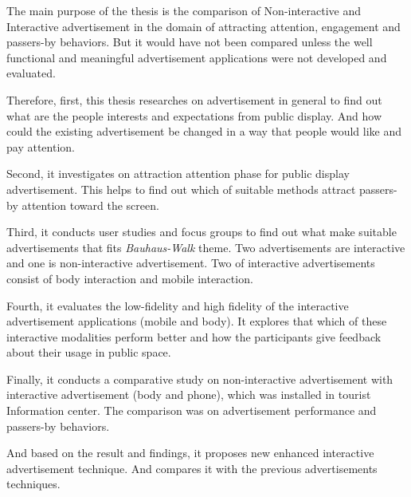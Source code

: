 The main purpose of the thesis is the comparison of Non-interactive and Interactive advertisement in the domain of attracting attention, engagement and passers-by behaviors. But it would have not been compared unless the well functional and meaningful advertisement applications were not developed and evaluated. 

Therefore, first, this thesis researches on advertisement in general to find out what are the people interests and expectations from public display. And how could the existing advertisement be changed in a way that people would like and pay attention.

Second, it investigates on attraction attention phase for public display advertisement. This helps to find out which of suitable methods attract passers-by attention toward the screen.

Third, it conducts user studies and focus groups to find out what make suitable advertisements that fits \emph{Bauhaus-Walk} theme. Two advertisements are interactive and one is non-interactive advertisement. Two of interactive advertisements consist of body interaction and mobile interaction.

Fourth, it evaluates the low-fidelity and high fidelity of the interactive advertisement applications (mobile and body). It explores that which of these interactive modalities perform better and how the participants give feedback about their usage in public space.

Finally, it conducts a comparative study on non-interactive advertisement with interactive advertisement (body and phone), which was installed in tourist Information center.  The comparison was on advertisement performance and passers-by behaviors.

And based on the result and findings, it proposes new enhanced interactive advertisement technique. And compares it with the previous advertisements techniques.




